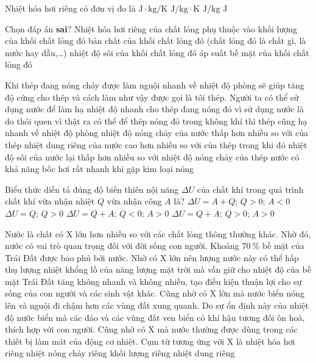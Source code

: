 \begin{ex}
Nhiệt hóa hơi riêng có đơn vị đo là	
	\choice
	{$\si{\joule\cdot\kilogram/\kelvin}$}
	{$\si{\joule/\kilogram\cdot\kelvin}$}
	{\True $\si{\joule/\kilogram}$}
	{$\si{\joule}$}
	\loigiai{}
\end{ex}
\begin{ex}
	Chọn đáp án \textbf{sai}? Nhiệt hóa hơi riêng của chất lỏng phụ thuộc vào
	\choice
	{\True khối lượng của khối chất lỏng đó}
	{bản chất của khối chất lỏng đó (chất lỏng đó là chất gì, là nước hay dầu,\dots)}
	{nhiệt độ sôi của khối chất lỏng đó}
	{áp suất bề mặt của khối chất lỏng đó}
	\loigiai{}
\end{ex}
\begin{ex}
	Khi thép đang nóng chảy được làm nguội nhanh về nhiệt độ phòng sẽ giúp tăng độ cứng cho thép và cách làm như vậy được gọi là tôi thép. Người ta có thể sử dụng nước để làm hạ nhiệt độ nhanh cho thép đang nóng đỏ vì
	\choice
	{sử dụng nước là do thói quen vì thật ra có thể để thép nóng đỏ trong không khí thì thép cũng hạ nhanh về nhiệt độ phòng}
	{nhiệt độ nóng chảy của nước thấp hơn nhiều so với của thép}
	{\True nhiệt dung riêng của nước cao hơn nhiều so với của thép trong khi đó nhiệt độ sôi của nước lại thấp hơn nhiều so với nhiệt độ nóng chảy của thép}
	{nước có khả năng bốc hơi rất nhanh khi gặp kim loại nóng}
	\loigiai{}
\end{ex}
\begin{ex}
	Biểu thức diễn tả đúng độ biến thiên nội năng $\Delta U$ của chất khí trong quá trình chất khí vừa nhận nhiệt $Q$ vừa nhận công $A$ là?
	\choice
	{$\Delta U=A+Q$; $Q>0$; $A<0$}
	{$\Delta U=Q$; $Q>0$}
	{$\Delta U=Q+A$; $Q<0 $; $A>0$}
	{\True $\Delta U=Q+A$; $Q>0 $; $A>0$}
	\loigiai{}
\end{ex}
\begin{ex}
	Nước là chất có X lớn hơn nhiều so với các chất lỏng thông thường khác. Nhờ đó, nước có vai trò quan trọng đối với đời sống con người. Khoảng $\SI{70}{\percent}$ bề mặt của Trái Đất được bao phủ bởi nước. Nhờ có X lớn nên lượng nước này có thể hấp thụ lượng nhiệt khổng lồ của năng lượng mặt trời mà vẫn giữ cho nhiệt độ của bề mặt Trái Đất tăng không nhanh và không nhiều, tạo điều kiện thuận lợi cho sự sống của con người và các sinh vật khác. Cũng nhờ có X lớn mà nước biển nóng lên và nguội đi chậm hơn các vùng đất xung quanh. Do sự ổn định này của nhiệt độ nước biển mà các đảo và các vùng đất ven biển có khí hậu tương đối ôn hoà, thích hợp với con người. Cũng nhờ có X mà nước thường được dùng trong các thiết bị làm mát của động cơ nhiệt. Cụm từ tương ứng với X là
	\choice
	{nhiệt hóa hơi riêng}
	{nhiệt nóng chảy riêng}
	{khối lượng riêng}
	{\True nhiệt dung riêng}
	\loigiai{}
\end{ex}
